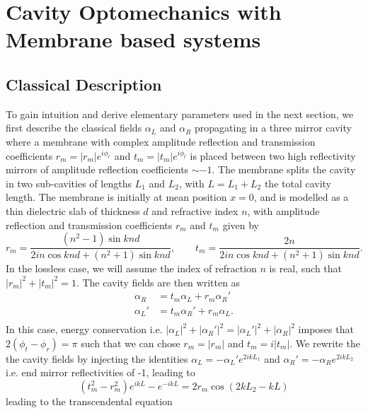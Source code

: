 \section{Cavity Optomechanics with Membrane based systems }
\subsection{Classical Description}
To gain intuition and derive elementary parameters used in the next section, we first describe the classical fields $\alpha_L$ and $\alpha_R$ propagating in a three mirror cavity where a membrane with complex amplitude reflection and transmission coefficients \(r_m=|r_m|e^{i\phi_r}\) and \(t_m=|t_m|e^{i\phi_t}\) is placed between two high reflectivity mirrors of amplitude reflection coefficients \( \sim -1 \). The membrane splits the cavity in two sub-cavities of lengths \(L_1\) and \(L_2\), with \(L=L_1+L_2\) the total cavity length. The membrane is initially at mean position $x=0$, and is modelled as a thin dielectric slab of thickness \(d\) and refractive index \(n\), with amplitude reflection and transmission coefficients \(r_m\) and \(t_m\) given by \cite{thompson_strong_2008}
\begin{equation}
r_m = \frac{(n^2-1)\sin k n d}{2 i n \cos k n d  + (n^2+1)\sin k n d}, \qquad t_m = \frac{2 n}{2 i n \cos k n d  + (n^2+1)\sin k n d}. 
\end{equation}
In the lossless case, we will assume the index of refraction $n$ is real, such that \(|r_m|^2 + |t_m|^2 = 1\). The cavity fields are then written as
\begin{equation}
\begin{split}
\alpha_R &= t_m \alpha_L + r_m \alpha_R' \\ 
\alpha_L' &= t_m \alpha_R' + r_m \alpha_L. \\
\end{split}
\end{equation}
In this case, energy conservation i.e. $|\alpha_L|^2 + |\alpha_R'|^2 = |\alpha_L'|^2 + |\alpha_R|^2$ imposes that $2(\phi_t-\phi_r) = \pi$ such that we can chose $r_m = |r_m|$ and $t_m = i|t_m|$. We rewrite the the cavity fields by injecting the identities $\alpha_L = - \alpha_L' e^{2ikL_1}$ and $\alpha_R' = - \alpha_R e^{2ikL_2}$ i.e. end mirror reflectivities of -1, leading to
\begin{equation}
   (t_m^2 - r_m^2) e^{ikL} - e^{-ikL}  = 2 r_m \cos(2kL_2 - kL )
\end{equation}
leading to the transcendental equation \cite{jayich_dispersive_2008}
